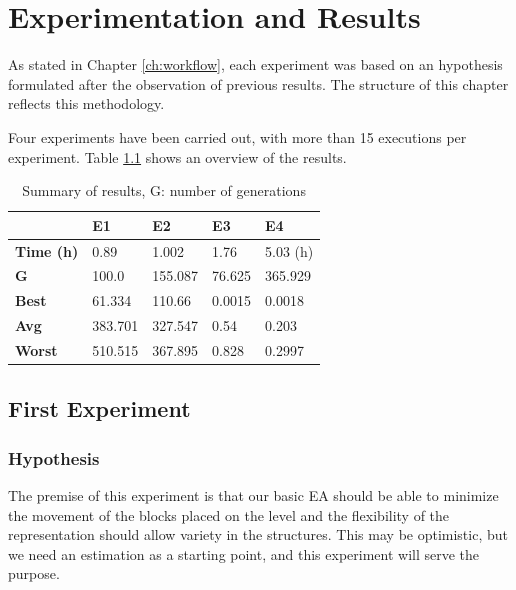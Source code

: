 \chapter{Experimentation and Results}\label{ch:res}
As stated in Chapter \ref{ch:workflow}, each experiment was based on an hypothesis formulated after the observation of previous results. The structure of this chapter reflects this methodology.

Four experiments have been carried out, with more than 15 executions per experiment. Table \ref{t:resOver} shows an overview of the results.
\begin{table}[H]
	\myfloatalign
	\begin{tabularx}{\textwidth}{XXXXX} \toprule
		& \textbf{E1} & \textbf{E2} & \textbf{E3} &\textbf{E4} \\ \midrule
		\textbf{Time (h)} & 0.89 & 1.002 & 1.76 & 5.03 (h) \\ \midrule
		\textbf{G} &  100.0 & 155.087 & 76.625 & 365.929 \\ \midrule
		\textbf{Best} & 61.334 & 110.66 & 0.0015 & 0.0018 \\ \midrule
		\textbf{Avg} & 383.701 & 327.547 & 0.54 &  0.203 \\ \midrule
		\textbf{Worst}  & 510.515 & 367.895 & 0.828 & 0.2997\\ \midrule

		\bottomrule
	\end{tabularx}
	\caption{Summary of results, G: number of generations}
	\label{t:resOver}
\end{table}

\section{First Experiment}
\subsection{Hypothesis}
The premise of this experiment is that our basic \acs{EA} should be able to minimize the movement of the blocks placed on the level and the flexibility of the representation should allow variety in the structures. This may be optimistic, but we need an estimation as a starting point, and this experiment will serve the purpose. 
